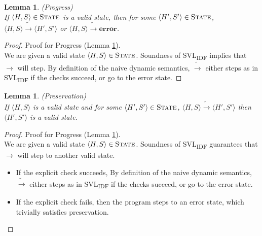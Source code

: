\documentclass {article}
\newtheorem{lemma}[theorem]{Lemma}
\begin{document}
\begin{lemma} (Progress)\\
\label{lemma_progress}
If $\langle H, S \rangle \in \textsc{State}$ is a valid state, then for some $\langle H', S' \rangle \in \textsc{State}$, $\langle H, S \rangle \widetilde{\longrightarrow} \langle H', S' \rangle$ or $\langle H, S \rangle \widetilde{\longrightarrow} \textbf{error}$. 
\end{lemma}
\begin{proof} Proof for Progress (Lemma \ref{lemma_progress}). \\
We are given a valid state $\langle H,S\rangle \in \textsc{State}$. Soundness of SVL\textsubscript{IDF} implies that $\longrightarrow$ will step. By definition of the naive dynamic semantics, $\widetilde{\longrightarrow}$ either steps as in SVL\textsubscript{IDF} if the checks succeed, or go to the error state. 
\end{proof}

\begin{lemma} (Preservation)\\
\label{lemma_preservation}
If $\langle H, S \rangle$ is a valid state and for some $\langle H', S' \rangle \in \textsc{State}$, $\langle H, S \rangle \widetilde{\longrightarrow} \langle H', S' \rangle$ then $\langle H', S' \rangle$ is a valid state.
\end{lemma}

\begin{proof} Proof for Progress (Lemma \ref{lemma_preservation}). \\
We are given a valid state $\langle H,S\rangle \in \textsc{State}$. Soundness of SVL\textsubscript{IDF} guarantees that $\longrightarrow$ will step to another valid state.\\
\begin{itemize}
    \item If the explicit check succeeds, By definition of the naive dynamic semantics, $\widetilde{\longrightarrow}$ either steps as in SVL\textsubscript{IDF} if the checks succeed, or go to the error state. 
    \item If the explicit check fails, then the program steps to an error state, which trivially satisfies preservation. 

\end{itemize}
\end{proof}
\end{document}
